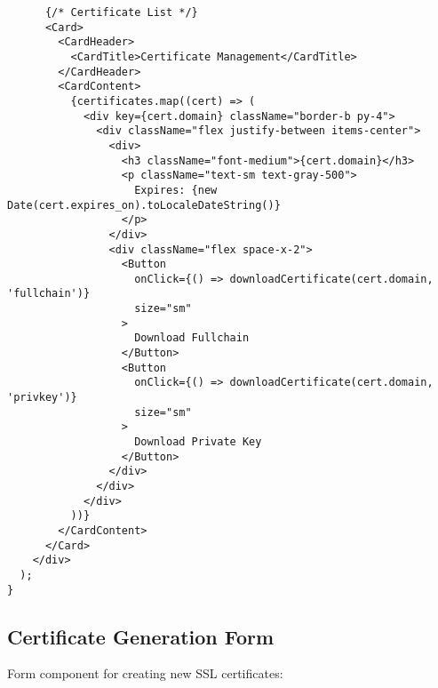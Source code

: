 \begin{verbatim}
      {/* Certificate List */}
      <Card>
        <CardHeader>
          <CardTitle>Certificate Management</CardTitle>
        </CardHeader>
        <CardContent>
          {certificates.map((cert) => (
            <div key={cert.domain} className="border-b py-4">
              <div className="flex justify-between items-center">
                <div>
                  <h3 className="font-medium">{cert.domain}</h3>
                  <p className="text-sm text-gray-500">
                    Expires: {new Date(cert.expires_on).toLocaleDateString()}
                  </p>
                </div>
                <div className="flex space-x-2">
                  <Button
                    onClick={() => downloadCertificate(cert.domain, 'fullchain')}
                    size="sm"
                  >
                    Download Fullchain
                  </Button>
                  <Button
                    onClick={() => downloadCertificate(cert.domain, 'privkey')}
                    size="sm"
                  >
                    Download Private Key
                  </Button>
                </div>
              </div>
            </div>
          ))}
        </CardContent>
      </Card>
    </div>
  );
}
\end{verbatim}

\subsection{Certificate Generation Form}

Form component for creating new SSL certificates:

